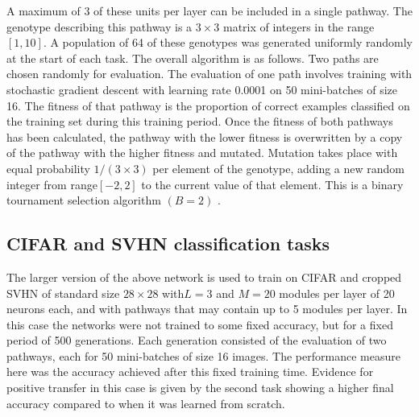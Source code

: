 \documentclass{sig-alternate-05-2015}
\begin{document}
A maximum of 3 of these units per layer can be included in a single pathway. The genotype describing this pathway is a \(3 \times 3\) matrix of integers in the range \([1,10]\). A population of 64 of these genotypes was generated uniformly randomly at the start of each task. The overall algorithm is as follows. Two paths are chosen randomly for evaluation. The evaluation of one path involves training with stochastic gradient descent with learning rate 0.0001 on 50 mini-batches of size 16. The fitness of that pathway is the proportion of correct examples classified on the training set during this training period. Once the fitness of both pathways has been calculated, the pathway with the lower fitness is overwritten by a copy of the pathway with the higher fitness and mutated. Mutation takes place with equal probability \(1/(3 \times 3) \) per element of the genotype, adding a new random integer from range\([-2, 2]\) to the current value of that element. This is a binary tournament selection algorithm \((B = 2)\) \cite{harvey2011microbial}.\\ 

\subsection{CIFAR and SVHN classification tasks} 
The larger version of the above network is used to train on CIFAR and cropped SVHN \cite{netzer2011reading} of standard size \(28 \times 28\) with\( L = 3\) and \(M = 20\) modules per layer of 20 neurons each, and with pathways that may contain up to 5 modules per layer. In this case the networks were not trained to some fixed accuracy, but for a fixed period of 500 generations. Each generation consisted of the evaluation of two pathways, each for 50 mini-batches of size 16 images. The performance measure here was the accuracy achieved after this fixed training time. Evidence for positive transfer in this case is given by the second task showing a higher final accuracy compared to when it was learned from scratch.\\
\end{document}
